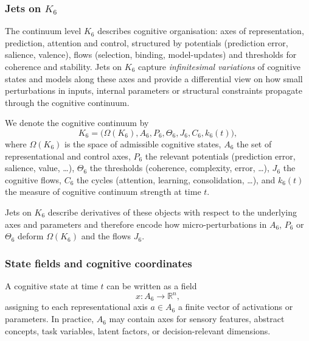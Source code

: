 
\subsubsection{Jets on \texorpdfstring{$K_6$}{K6}}
\label{sec:jets-k6}

The continuum level $K_6$ describes cognitive organisation:
axes of representation, prediction, attention and control,
structured by potentials (prediction error, salience, valence),
flows (selection, binding, model-updates) and thresholds
for coherence and stability.  Jets on $K_6$ capture
\emph{infinitesimal variations} of cognitive states and models
along these axes and provide a differential view on how small
perturbations in inputs, internal parameters or structural
constraints propagate through the cognitive continuum.

We denote the cognitive continuum by
\[
  K_6 = \bigl(\Omega(K_6), A_6, P_6, \Theta_6, J_6, C_6, k_6(t)\bigr),
\]
where $\Omega(K_6)$ is the space of admissible cognitive states,
$A_6$ the set of representational and control axes,
$P_6$ the relevant potentials (prediction error, salience, value, \dots),
$\Theta_6$ the thresholds (coherence, complexity, error, \dots),
$J_6$ the cognitive flows, $C_6$ the cycles (attention, learning,
consolidation, \dots), and $k_6(t)$ the measure of cognitive
continuum strength at time $t$.

Jets on $K_6$ describe derivatives of these objects with respect to
the underlying axes and parameters and therefore encode how
micro-perturbations in $A_6$, $P_6$ or $\Theta_6$ deform $\Omega(K_6)$
and the flows $J_6$.


\subsubsection{State fields and cognitive coordinates}

A cognitive state at time $t$ can be written as a field
\[
  x : A_6 \to \mathbb{R}^n,
\]
assigning to each representational axis $a \in A_6$ a finite vector
of activations or parameters.  In practice, $A_6$ may contain axes
for sensory features, abstract concepts, task variables, latent
factors, or decision-relevant dimensions.

